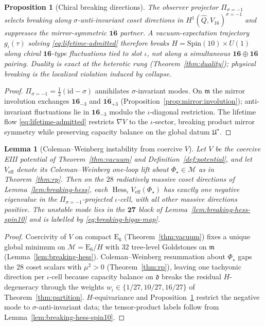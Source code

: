\documentclass[aps,prd,onecolumn,amsmath,amssymb,nofootinbib,11pt]{revtex4-2}
\numberwithin{equation}{section}
\theoremstyle{plain}
\newtheorem{lemma}[theorem]{Lemma}
\newtheorem{proposition}[theorem]{Proposition}
\theoremstyle{definition}
\theoremstyle{remark}
\newcommand{\E}[1]{\mathrm{E}_{#1}}
\newcommand{\Spin}{\mathrm{Spin}}
\newcommand{\orderparam}{\Phi}
\newcommand{\Hess}{\operatorname{Hess}}
\begin{document}
\begin{proposition}[Chiral breaking directions]\label{prop:breaking-chiral}
The observer projector $\Pi_{\sigma=-1}$ selects breaking along
$\sigma$-anti-invariant coset directions in
$H^1(\hat Q,V_{16})^{\sigma=-1}$ and suppresses the mirror-symmetric
$\overline{\mathbf{16}}$ partner. A vacuum-expectation trajectory $g_\iota(\tau)$
solving \eqref{eq:lifetime-admitted} therefore breaks
$H=\Spin(10)\times U(1)$ along chiral $\mathbf{16}$-type fluctuations tied to
slot $\iota$, not along a simultaneous
$\mathbf{16}\oplus\overline{\mathbf{16}}$ pairing. Duality is exact at the
heterotic rung (Theorem~\ref{thm:duality}); physical breaking is the localized
violation induced by collapse.
\end{proposition}

\begin{proof}
$\Pi_{\sigma=-1}=\tfrac12(\mathrm{id}-\sigma)$ annihilates $\sigma$-invariant
modes. On $\mathfrak{m}$ the mirror involution exchanges
$\mathbf{16}_{-3}$ and $\overline{\mathbf{16}}_{+3}$
(Proposition~\ref{prop:mirror:involution}); anti-invariant fluctuations lie in
$\mathbf{16}_{-3}$ modulo the $\iota$-diagonal restriction. The lifetime flow
\eqref{eq:lifetime-admitted} restricts $\nabla V$ to the $\iota$-sector,
breaking product mirror symmetry while preserving capacity balance on the global
datum $\mathfrak{U}^\star$.
\end{proof}

\begin{lemma}[Coleman--Weinberg instability from coercive $V$]
\label{lem:breaking-cw}
Let $V$ be the coercive EIII potential of Theorem~\ref{thm:vacuum}
and Definition~\ref{def:potential}, and let $V_{\mathrm{eff}}$ denote its Coleman--Weinberg
one-loop lift about $\orderparam_\star\in\mathcal{M}$ as in
Theorem~\ref{thm:rp}. Then on the $28$ radiatively massive coset directions of
Lemma~\ref{lem:breaking-hess}, each $\Hess_\iota V_{\mathrm{eff}}(\orderparam_\star)$
has exactly one negative eigenvalue in the
$\Pi_{\sigma=-1}$-projected $\iota$-cell, with all other massive directions
positive. The unstable mode lies in the $\mathbf{27}$ block of
Lemma~\ref{lem:breaking-hess-spin10} and is labelled by
\eqref{eq:breaking-higgs-map}.
\end{lemma}

\begin{proof}
Coercivity of $V$ on compact $\E{6}$ (Theorem~\ref{thm:vacuum}) fixes a unique
global minimum on $\mathcal{M}=\E{6}/H$ with $32$ tree-level Goldstones on
$\mathfrak{m}$ (Lemma~\ref{lem:breaking-hess}). Coleman--Weinberg resummation
about $\orderparam_\star$ gaps the $28$ coset scalars with $\mu^2>0$
(Theorem~\ref{thm:rp}), leaving one tachyonic direction per $\iota$-cell because
capacity balance on $\mathfrak{d}$ breaks the residual $H$-degeneracy through
the weights $w_\iota\in\{1/27,10/27,16/27\}$ of Theorem~\ref{thm:partition}.
$H$-equivariance and Proposition~\ref{prop:breaking-chiral} restrict the
negative mode to $\sigma$-anti-invariant data; the tensor-product labels follow
from Lemma~\ref{lem:breaking-hess-spin10}.
\end{proof}
\end{document}
